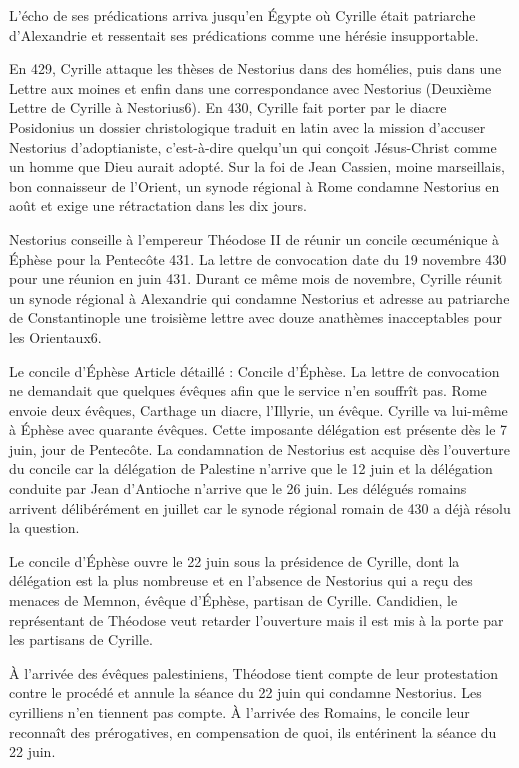 L'écho de ses prédications arriva jusqu'en Égypte où Cyrille était patriarche d'Alexandrie et ressentait ses prédications comme une hérésie insupportable.

En 429, Cyrille attaque les thèses de Nestorius dans des homélies, puis dans une Lettre aux moines et enfin dans une correspondance avec Nestorius (Deuxième Lettre de Cyrille à Nestorius6). En 430, Cyrille fait porter par le diacre Posidonius un dossier christologique traduit en latin avec la mission d'accuser Nestorius d'adoptianiste, c'est-à-dire quelqu'un qui conçoit Jésus-Christ comme un homme que Dieu aurait adopté. Sur la foi de Jean Cassien, moine marseillais, bon connaisseur de l'Orient, un synode régional à Rome condamne Nestorius en août et exige une rétractation dans les dix jours.

Nestorius conseille à l'empereur Théodose II de réunir un concile œcuménique à Éphèse pour la Pentecôte 431. La lettre de convocation date du 19 novembre 430 pour une réunion en juin 431. Durant ce même mois de novembre, Cyrille réunit un synode régional à Alexandrie qui condamne Nestorius et adresse au patriarche de Constantinople une troisième lettre avec douze anathèmes inacceptables pour les Orientaux6.

Le concile d'Éphèse
Article détaillé : Concile d'Éphèse.
La lettre de convocation ne demandait que quelques évêques afin que le service n'en souffrît pas. Rome envoie deux évêques, Carthage un diacre, l'Illyrie, un évêque. Cyrille va lui-même à Éphèse avec quarante évêques. Cette imposante délégation est présente dès le 7 juin, jour de Pentecôte. La condamnation de Nestorius est acquise dès l'ouverture du concile car la délégation de Palestine n'arrive que le 12 juin et la délégation conduite par Jean d'Antioche n'arrive que le 26 juin. Les délégués romains arrivent délibérément en juillet car le synode régional romain de 430 a déjà résolu la question.

Le concile d'Éphèse ouvre le 22 juin sous la présidence de Cyrille, dont la délégation est la plus nombreuse et en l'absence de Nestorius qui a reçu des menaces de Memnon, évêque d'Éphèse, partisan de Cyrille. Candidien, le représentant de Théodose veut retarder l'ouverture mais il est mis à la porte par les partisans de Cyrille.

À l'arrivée des évêques palestiniens, Théodose tient compte de leur protestation contre le procédé et annule la séance du 22 juin qui condamne Nestorius. Les cyrilliens n'en tiennent pas compte. À l'arrivée des Romains, le concile leur reconnaît des prérogatives, en compensation de quoi, ils entérinent la séance du 22 juin.

